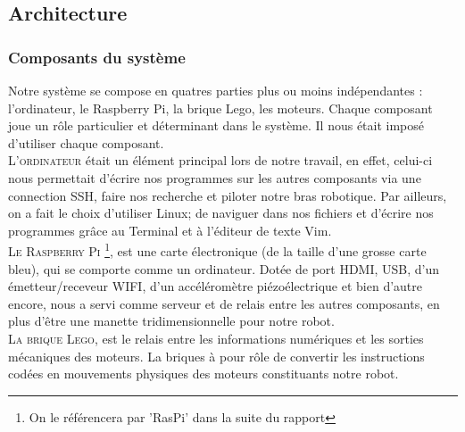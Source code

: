 \documentclass[twoside,twocolumn, 16pt]{article}
\begin{document}
\subsection{Architecture}
\subsubsection{Composants du système}
Notre système se compose en quatres parties plus ou moins indépendantes : l’ordinateur, le Raspberry Pi, la brique Lego, les moteurs. Chaque composant joue un rôle particulier et déterminant dans le système. Il nous était imposé d’utiliser chaque composant. \\
\indent \textsc{L'ordinateur} était un élément principal lors de notre travail, en effet, celui-ci nous permettait d’écrire nos programmes sur les autres composants via une connection SSH, faire nos recherche et piloter notre bras robotique. Par ailleurs, on a fait le choix d’utiliser Linux; de naviguer dans nos fichiers et d’écrire nos programmes grâce au Terminal et à l’éditeur de texte Vim. \\
\indent \textsc{Le Raspberry Pi} \footnote{On le référencera par 'RasPi' dans la suite du rapport}, est une carte électronique (de la taille d’une grosse carte bleu), qui se comporte comme un ordinateur. Dotée de port HDMI, USB, d’un émetteur/receveur WIFI, d’un accéléromètre piézoélectrique et bien d’autre encore, nous a servi comme serveur et de relais entre les autres composants, en plus d’être une manette tridimensionnelle pour notre robot. \\ 
\indent \textsc{La brique Lego}, est le relais entre les informations numériques et les sorties mécaniques des moteurs. La briques à pour rôle de convertir les instructions codées en mouvements physiques des moteurs constituants notre robot.
\vspace{-1cm}
\end{document}
